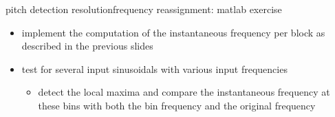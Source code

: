         \begin{frame}{pitch detection resolution}{frequency reassignment: matlab exercise}
            
            \begin{itemize}
                \item   implement the computation of the instantaneous frequency per block as described in the previous slides
                \item   test for several input sinusoidals with various input frequencies
                    \begin{itemize}
                        \item   detect the local maxima and compare the instantaneous frequency at these bins with both the bin frequency and the original frequency
                    \end{itemize}
            \end{itemize}
        \end{frame}
            
